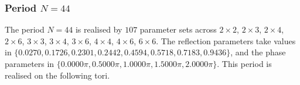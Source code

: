 \par
\subsubsection{Period $N = 44$}
The period $N=44$ is realised by $107$ parameter sets across $2\times2$, $2\times3$, $2\times4$, $2\times6$, $3\times3$, $3\times4$, $3\times6$, $4\times4$, $4\times6$, $6\times6$. The reflection parameters take values in $\{0.0270, 0.1726, 0.2301, 0.2442, 0.4594, 0.5718, 0.7183, 0.9436\}$, and the phase parameters in $\{0.0000\pi, 0.5000\pi, 1.0000\pi, 1.5000\pi, 2.0000\pi\}$. This period is realised on the following tori.
